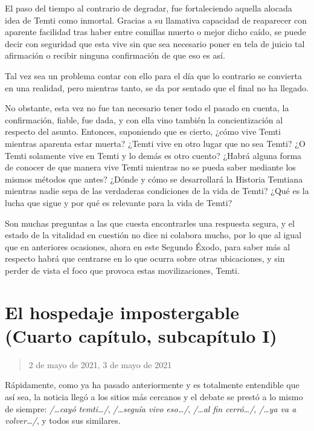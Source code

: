 \documentclass[
  spanish,
]{book}
\begin{document}
El paso del tiempo al contrario de degradar, fue fortaleciendo aquella alocada idea de Temti como inmortal. Gracias a su llamativa capacidad de reaparecer con aparente facilidad tras haber entre comillas muerto o mejor dicho caído, se puede decir con seguridad que esta vive sin que sea necesario poner en tela de juicio tal afirmación o recibir ninguna confirmación de que eso es así.

Tal vez sea un problema contar con ello para el día que lo contrario se convierta en una realidad, pero mientras tanto, se da por sentado que el final no ha llegado.

No obstante, esta vez no fue tan necesario tener todo el pasado en cuenta, la confirmación, fiable, fue dada, y con ella vino también la concientización al respecto del asunto. Entonces, suponiendo que es cierto, ¿cómo vive Temti mientras aparenta estar muerta? ¿Temti vive en otro lugar que no sea Temti? ¿O Temti solamente vive en Temti y lo demás es otro cuento? ¿Habrá alguna forma de conocer de que manera vive Temti mientras no se pueda saber mediante los mismos métodos que antes? ¿Dónde y cómo se desarrollará la Historia Temtiana mientras nadie sepa de las verdaderas condiciones de la vida de Temti? ¿Qué es la lucha que sigue y por qué es relevante para la vida de Temti?

Son muchas preguntas a las que cuesta encontrarles una respuesta segura, y el estado de la vitalidad en cuestión no dice ni colabora mucho, por lo que al igual que en anteriores ocasiones, ahora en este Segundo Éxodo, para saber más al respecto habrá que centrarse en lo que ocurra sobre otras ubicaciones, y sin perder de vista el foco que provoca estas movilizaciones, Temti.

\hypertarget{el-hospedaje-impostergable-cuarto-capuxedtulo-subcapuxedtulo-i}{%
\section{El hospedaje impostergable (Cuarto capítulo, subcapítulo I)}\label{el-hospedaje-impostergable-cuarto-capuxedtulo-subcapuxedtulo-i}}

\begin{quote}
2 de mayo de 2021, 3 de mayo de 2021
\end{quote}

Rápidamente, como ya ha pasado anteriormente y es totalmente entendible que así sea, la noticia llegó a los sitios más cercanos y el debate se prestó a lo mismo de siempre: \emph{/\ldots cayó temti\ldots/}, \emph{/\ldots seguía vivo eso\ldots/}, \emph{/\ldots al fin cerró\ldots/}, \emph{/\ldots ya va a volver\ldots/}, y todos sus similares.
\end{document}
